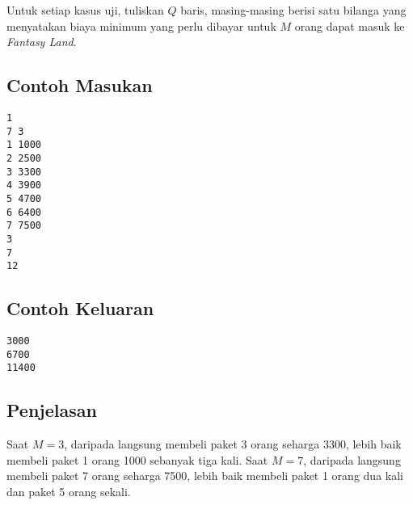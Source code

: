\documentclass{article}
\begin{document}
Untuk setiap kasus uji, tuliskan $Q$ baris, masing-masing berisi satu bilanga yang menyatakan biaya minimum yang perlu dibayar untuk $M$ orang dapat masuk ke \textit{Fantasy Land}.

\begin{multicols}{2}
\subsection*{Contoh Masukan}
\begin{lstlisting}
1
7 3
1 1000
2 2500
3 3300
4 3900
5 4700
6 6400
7 7500
3
7
12
\end{lstlisting}
\columnbreak
\subsection*{Contoh Keluaran}
\begin{lstlisting}
3000
6700
11400
\end{lstlisting}
\vfill
\null
\end{multicols}


\subsection*{Penjelasan}

Saat $M=3$, daripada langsung membeli paket 3 orang seharga 3300, lebih baik membeli paket 1 orang 1000 sebanyak tiga kali.
Saat $M=7$, daripada langsung membeli paket 7 orang seharga 7500, lebih baik membeli paket 1 orang dua kali dan paket 5 orang sekali.

\pagebreak
\end{document}
